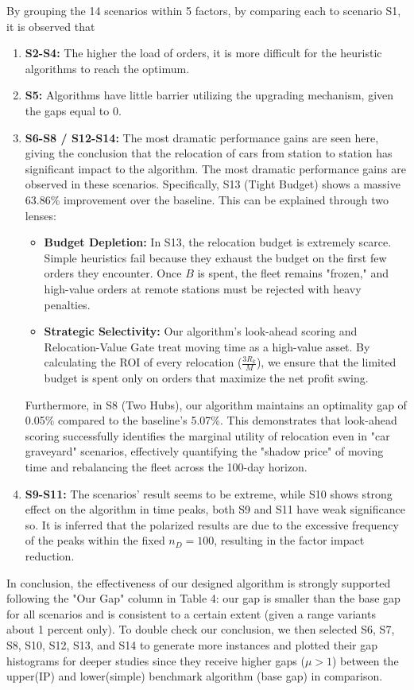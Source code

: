 \documentclass[10pt,a4paper]{article}
\begin{document}
By grouping the 14 scenarios within 5 factors, by comparing each to scenario S1, it is observed that 
\begin{enumerate}[label=\Alph*., itemsep=-1pt]
    \item \textbf{S2-S4:} The higher the load of orders, it is more difficult for the heuristic algorithms to reach the optimum.
    \item \textbf{S5:} Algorithms have little barrier utilizing the upgrading mechanism, given the gaps equal to 0.
    \item \textbf{S6-S8 / S12-S14:}  The most dramatic performance gains are seen here, giving the conclusion that the relocation of cars from station to station has significant impact to the algorithm. The most dramatic performance gains are observed in these scenarios. Specifically, S13 (Tight Budget) shows a massive 63.86\% improvement over the baseline. This can be explained through two lenses:
\begin{itemize}
\item \textbf{Budget Depletion:} In S13, the relocation budget is extremely scarce. Simple heuristics fail because they exhaust the budget on the first few orders they encounter. Once $B$ is spent, the fleet remains "frozen," and high-value orders at remote stations must be rejected with heavy penalties.
\item \textbf{Strategic Selectivity:} Our algorithm's look-ahead scoring and Relocation-Value Gate treat moving time as a high-value asset. By calculating the ROI of every relocation ($\frac{3R_k}{M}$), we ensure that the limited budget is spent only on orders that maximize the net profit swing.
\end{itemize}
Furthermore, in S8 (Two Hubs), our algorithm maintains an optimality gap of 0.05\% compared to the baseline's 5.07\%. This demonstrates that look-ahead scoring successfully identifies the marginal utility of relocation even in "car graveyard" scenarios, effectively quantifying the "shadow price" of moving time and rebalancing the fleet across the 100-day horizon.
    \item \textbf{S9-S11:} The scenarios' result seems to be extreme, while S10 shows strong effect on the algorithm in time peaks, both S9 and S11 have weak significance so. It is inferred that the polarized results are due to the excessive frequency of the peaks within the fixed $n_D=100$, resulting in the factor impact reduction.
\end{enumerate}

In conclusion, the effectiveness of our designed algorithm is strongly supported following the "Our Gap" column in Table 4: our gap is smaller than the base gap for all scenarios and is consistent to a certain extent (given a range variants about 1 percent only). 
To double check our conclusion, we then selected S6, S7, S8, S10, S12, S13, and S14 to generate more instances and plotted their gap histograms for deeper studies since they receive higher gaps ($\mu>1$) between the upper(IP) and lower(simple) benchmark algorithm (base gap) in comparison.
\end{document}
